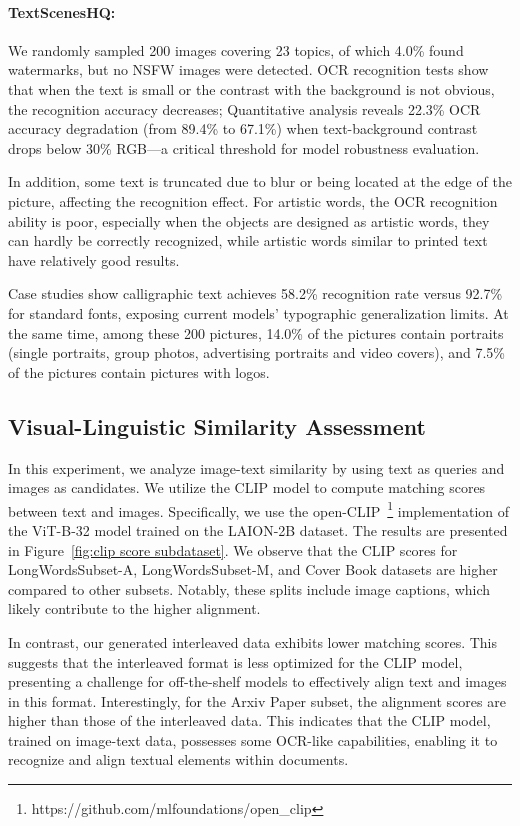\paragraph{TextScenesHQ:} 
We randomly sampled 200 images covering 23 topics, of which 4.0\% found watermarks, but no NSFW images were detected. OCR recognition tests show that when the text is small or the contrast with the background is not obvious, the recognition accuracy decreases;
Quantitative analysis reveals 22.3\% OCR accuracy degradation (from 89.4\% to 67.1\%) when text-background contrast drops below 30\% RGB—a critical threshold for model robustness evaluation.

In addition, some text is truncated due to blur or being located at the edge of the picture, affecting the recognition effect. For artistic words, the OCR recognition ability is poor, especially when the objects are designed as artistic words, they can hardly be correctly recognized, while artistic words similar to printed text have relatively good results.

Case studies show calligraphic text achieves 58.2\% recognition rate versus 92.7\% for standard fonts, exposing current models' typographic generalization limits.
At the same time, among these 200 pictures, 14.0\% of the pictures contain portraits (single portraits, group photos, advertising portraits and video covers), and 7.5\% of the pictures contain pictures with logos.


\subsection{Visual-Linguistic Similarity Assessment}
In this experiment, we analyze image-text similarity by using text as queries and images as candidates. 
We utilize the CLIP model to compute matching scores between text and images. 
Specifically, we use the open-CLIP~\footnote{https://github.com/mlfoundations/open\_clip} implementation of the ViT-B-32 model trained on the LAION-2B dataset.
The results are presented in Figure~\ref{fig:clip score subdataset}. 
We observe that the CLIP scores for LongWordsSubset-A, LongWordsSubset-M, and Cover Book datasets are higher compared to other subsets. 
Notably, these splits include image captions, which likely contribute to the higher alignment.

In contrast, our generated interleaved data exhibits lower matching scores. 
This suggests that the interleaved format is less optimized for the CLIP model, presenting a challenge for off-the-shelf models to effectively align text and images in this format.
Interestingly, for the Arxiv Paper subset, the alignment scores are higher than those of the interleaved data. 
This indicates that the CLIP model, trained on image-text data, possesses some OCR-like capabilities, enabling it to recognize and align textual elements within documents.




